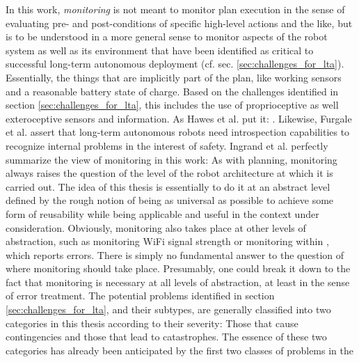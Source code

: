\documentclass[english, master, utf8]{base/thesis_KBS}
\newcommand{\code}{\collectverb{\codebox}}
\begin{document}
In this work, \textit{monitoring} is not meant to monitor plan execution in the sense of evaluating
pre- and post-conditions of specific high-level actions and the like, but is to be understood in a more general sense to monitor aspects of the robot system as well as its environment
that have been identified as critical to successful long-term autonomous deployment (cf. sec. \ref{sec:challenges_for_lta}). Essentially, the things that are implicitly part of the plan,
like working sensors and a reasonable battery state of charge. \cite{Ingrand:2017} Based on the challenges identified in section \ref{sec:challenges_for_lta}, this includes the use of
proprioceptive as well exteroceptive sensors and information. As Hawes et al. put it: . \cite{Hawes:2017} Likewise, Furgale et al. assert that long-term autonomous robots need introspection capabilities to recognize internal problems in
the interest of safety. \cite{Furgale:2015} Ingrand et al. perfectly summarize the view of monitoring in this work:  \cite{Ingrand:2017}
As with planning, monitoring always raises the question of the level of the robot architecture at which it is carried out. The idea of this thesis is essentially to do it at an abstract level
defined by the rough notion of being as universal as possible to achieve some form of reusability while being applicable and useful in the context under consideration. Obviously,
monitoring also takes place at other levels of abstraction, such as monitoring WiFi signal strength or monitoring within \code{move_base_flex}, which reports errors. There is simply
no fundamental answer to the question of where monitoring should take place. Presumably, one could break it down to the fact that monitoring is necessary at all levels of abstraction,
at least in the sense of error treatment.
The potential problems identified in section \ref{sec:challenges_for_lta}, and their subtypes, are generally classified into two categories in this thesis according to their severity:
Those that cause contingencies and those that lead to catastrophes. The essence of these two categories has already been anticipated by the first two classes of problems in the
\end{document}
